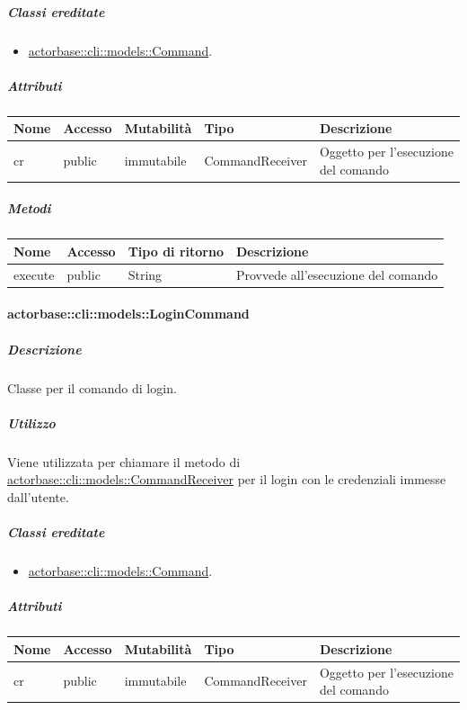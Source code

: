 \documentclass{scalatekids-article}
\begin{document}
\subparagraph{Classi ereditate}

\begin{itemize}
\item \hyperref[sec:actorbase::cli::models::Command]{actorbase::cli::models::Command}.
\end{itemize}

\subparagraph{Attributi}

\begin{tabular}{| p{1cm} | p{1.5cm} | p{2cm} | p{4cm} | p{8.5cm} |}
  \hline
  Nome & Accesso & Mutabilità & Tipo & Descrizione\\
  \hline
  cr & public & immutabile & CommandReceiver & Oggetto per l'esecuzione del comando\\
  \hline
\end{tabular}

\subparagraph{Metodi}

\begin{tabular}{| l | l | l | l |}
  \hline
  Nome & Accesso & Tipo di ritorno & Descrizione\\
  \hline
  execute & public & String & Provvede all'esecuzione del comando\\
  \hline
\end{tabular}

\paragraph{actorbase::cli::models::LoginCommand}
\label{sec:actorbase::cli::models::LoginCommand}

\subparagraph{Descrizione}

Classe per il comando di login.

\subparagraph{Utilizzo}

Viene utilizzata per chiamare il metodo di
\hyperref[sec:actorbase::cli::models::CommandReceiver]{actorbase::cli::models::CommandReceiver} per il login con le credenziali
immesse dall'utente.

\subparagraph{Classi ereditate}

\begin{itemize}
\item \hyperref[sec:actorbase::cli::models::Command]{actorbase::cli::models::Command}.
\end{itemize}

\subparagraph{Attributi}

\begin{tabular}{| p{1cm} | p{1.5cm} | p{2cm} | p{4cm} | p{8.5cm} |}
  \hline
  Nome & Accesso & Mutabilità & Tipo & Descrizione\\
  \hline
  cr & public & immutabile & CommandReceiver & Oggetto per l'esecuzione del comando\\
  \hline
\end{tabular}
\end{document}
